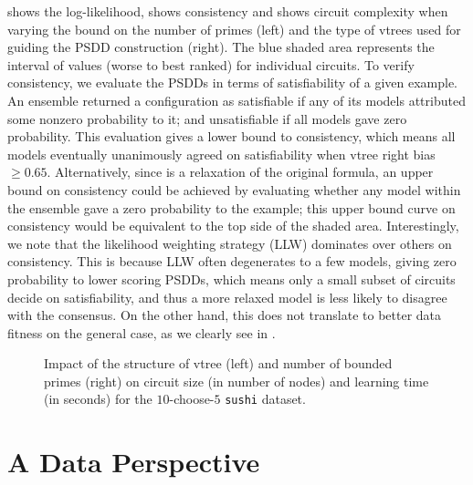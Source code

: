  shows the log-likelihood,  shows consistency and
 shows circuit complexity when varying the bound on the number of primes
(left) and the type of vtrees used for guiding the PSDD construction (right). The blue shaded area
represents the interval of values (worse to best ranked) for individual circuits. To verify
consistency, we evaluate the PSDDs in terms of satisfiability of a given example. An ensemble
returned a configuration as satisfiable if any of its models attributed some nonzero probability to
it; and unsatisfiable if all models gave zero probability. This evaluation gives a lower bound to
consistency, which means all models eventually unanimously agreed on satisfiability when vtree
right bias $\geq 0.65$. Alternatively, since  is a relaxation of the original
formula, an upper bound on consistency could be achieved by evaluating whether any model within the
ensemble gave a zero probability to the example; this upper bound curve on consistency would be
equivalent to the top side of the shaded area. Interestingly, we note that the likelihood weighting
strategy (LLW) dominates over others on consistency. This is because LLW often degenerates to a few
models, giving zero probability to lower scoring PSDDs, which means only a small subset of circuits
decide on satisfiability, and thus a more relaxed model is less likely to disagree with the
consensus. On the other hand, this does not translate to better data fitness on the general case,
as we clearly see in .

\begin{figure}[t]
  \begin{subfigure}{0.495\textwidth}
    \caption{}
  \end{subfigure}
  \begin{subfigure}{0.495\textwidth}
    \caption{}
  \end{subfigure}
  \caption{Impact of the structure of vtree (left) and number of bounded primes (right) on circuit
    size (in number of nodes) and learning time (in seconds) for the $10$-choose-$5$ \texttt{sushi}
    dataset.}
  \label{fig:compl-comp}
\end{figure}

\section{A Data Perspective}
\label{sec:data}

